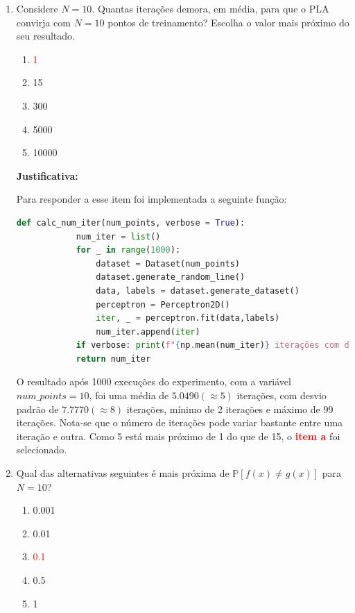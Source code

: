 \begin{enumerate}
    \item Considere $N = 10$. Quantas iterações demora, em média, para que o PLA convirja com $N = 10$
    pontos de treinamento? Escolha o valor mais próximo do seu resultado.

    \begin{enumerate}
        \item[\textcolor{red}{(a)}]\textcolor{red}{1}\addtocounter{enumii}{1}
        \item 15
        \item 300
        \item 5000
        \item 10000
    \end{enumerate}
     
    \par

    \textbf{Justificativa:}

    Para responder a esse item foi implementada a seguinte função:

    \begin{lstlisting}[language=Python, caption=Cálculo do número de iterações, label=cod:perceptron_num_iter]
        def calc_num_iter(num_points, verbose = True):
            num_iter = list()
            for _ in range(1000):
                dataset = Dataset(num_points)
                dataset.generate_random_line()
                data, labels = dataset.generate_dataset()
                perceptron = Perceptron2D()
                iter, _ = perceptron.fit(data,labels)
                num_iter.append(iter)
            if verbose: print(f"{np.mean(num_iter)} iterações com desvio padrão {np.std(num_iter):.4f} (min:{np.min(num_iter)}, máx:{np.max(num_iter)})")
            return num_iter
    \end{lstlisting}

    O resultado após 1000 execuções do experimento, com a variável $num\_points = 10$, foi uma média de $5.0490(\approx 5)$ iterações, com desvio padrão de $7.7770(\approx 8)$ iterações, mínimo de 2 iterações e máximo de 99 iterações. Nota-se que o número de iterações pode variar bastante entre uma iteração e outra. Como 5 está mais próximo de 1 do que de 15, o \textcolor{red}{\textbf{item a}} foi selecionado. 
    
    \item Qual das alternativas seguintes é mais próxima de $\mathbb{P}[f(x) \neq g(x)]$ para $N = 10$?
    
    \begin{enumerate}
        \item 0.001
        \item 0.01
        \item[\textcolor{red}{(c)}]\textcolor{red}{0.1}\addtocounter{enumii}{1}
        \item 0.5
        \item 1
    \end{enumerate}
     

\end{enumerate}
